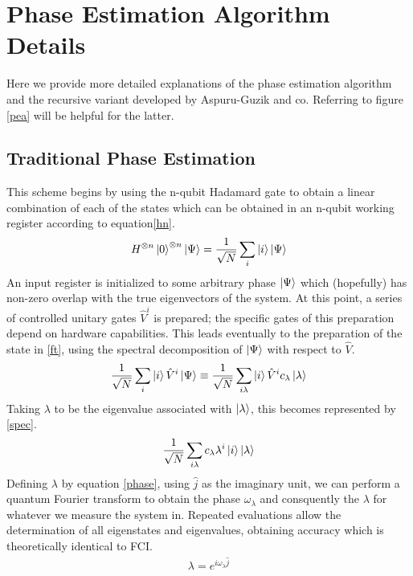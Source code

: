 \documentclass{article}
\begin{document}
\section{Phase Estimation Algorithm Details}\label{peaproof}
Here we provide more detailed explanations of the phase estimation algorithm and the recursive variant developed by Aspuru-Guzik and co.\cite{lloyd, alan} Referring to figure \ref{pea} will be helpful for the latter.
\subsection{Traditional Phase Estimation \cite{lloyd}}
\begin{paragraph}{}
This scheme begins by using the n-qubit Hadamard gate to obtain a linear combination of each of the states which can be obtained in an n-qubit working register according to equation\ref{hn}.
\begin{align}\label{hn}
H^{\otimes n}\ket{0}^{\otimes n}\ket{\Psi}=\frac{1}{\sqrt{N}}\sum_{i}\ket{i}\ket{\Psi}
\end{align}
An input register is initialized to some arbitrary phase $\ket{\Psi}$ which (hopefully) has non-zero overlap with the true eigenvectors of the system.  At this point, a series of controlled unitary gates $\hat{V}^i$ is prepared; the specific gates of this preparation depend on hardware capabilities.  This leads eventually to the preparation of the state in \ref{ft}, using the spectral decomposition of $\ket{\Psi}$ with respect to $\hat{V}$.
\begin{align}\label{ft}
\frac{1}{\sqrt{N}}\sum_i \ket{i}\hat{V}^i\ket{\Psi}\equiv \frac{1}{\sqrt{N}}\sum_{i\lambda}\ket{i}\hat{V}^ic_\lambda \ket{\lambda}
\end{align}
Taking $\lambda$ to be the eigenvalue associated with $\ket{\lambda}$, this becomes represented by \ref{spec}.
\begin{align}\label{spec}
\frac{1}{\sqrt{N}}\sum_{i\lambda}c_\lambda\lambda^i\ket{i}\ket{\lambda}
\end{align}
Defining $\lambda$ by equation \ref{phase}, using $\hat{j}$ as the imaginary unit, we can perform a quantum Fourier transform to obtain the phase $\omega_\lambda$ and consquently the $\lambda$ for whatever we measure the system in.  Repeated evaluations allow the determination of all eigenstates and eigenvalues, obtaining accuracy which is theoretically identical to FCI.
\begin{align}\label{phase}
\lambda =  e^{i\omega_\lambda \hat{j}}
\end{align}
\end{paragraph}
\end{document}
